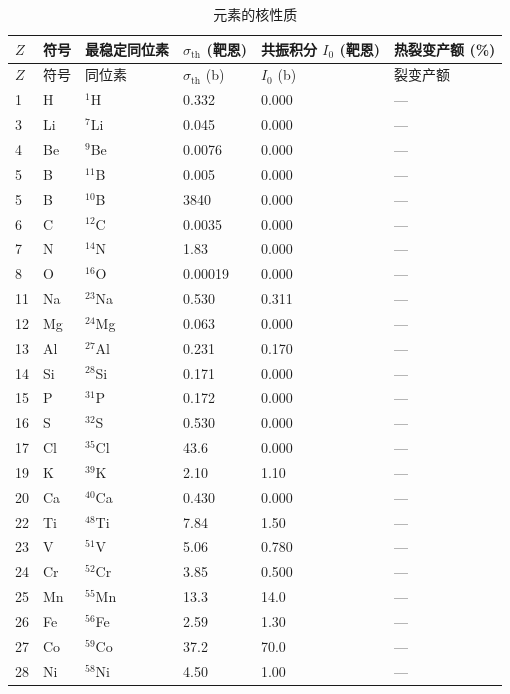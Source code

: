 \documentclass[12pt,a4paper]{article}
\begin{document}
	\begin{longtable}{p{0.8cm}p{1.2cm}p{2.0cm}p{2.5cm}p{2.5cm}p{2.5cm}}
		\caption{元素的核性质} \label{tab:nuclear-properties-func} \\
		\toprule
		\(Z\) & 符号 & 最稳定同位素 & \(\sigma_{\text{th}}\) (靶恩) & 共振积分 \(I_0\) (靶恩) & 热裂变产额 (\%) \\
		\midrule
		\endfirsthead
		\toprule
		\(Z\) & 符号 & 同位素 & \(\sigma_{\text{th}}\) (b) & \(I_0\) (b) & 裂变产额 \\
		\midrule
		\endhead
		1  & H  & \(^{1}\)H & 0.332 & 0.000 & --- \\
		3  & Li & \(^{7}\)Li & 0.045 & 0.000 & --- \\
		4  & Be & \(^{9}\)Be & 0.0076 & 0.000 & --- \\
		5  & B  & \(^{11}\)B & 0.005 & 0.000 & --- \\
		5  & B  & \(^{10}\)B & 3840 & 0.000 & --- \\
		6  & C  & \(^{12}\)C & 0.0035 & 0.000 & --- \\
		7  & N  & \(^{14}\)N & 1.83 & 0.000 & --- \\
		8  & O  & \(^{16}\)O & 0.00019 & 0.000 & --- \\
		11 & Na & \(^{23}\)Na & 0.530 & 0.311 & --- \\
		12 & Mg & \(^{24}\)Mg & 0.063 & 0.000 & --- \\
		13 & Al & \(^{27}\)Al & 0.231 & 0.170 & --- \\
		14 & Si & \(^{28}\)Si & 0.171 & 0.000 & --- \\
		15 & P  & \(^{31}\)P & 0.172 & 0.000 & --- \\
		16 & S  & \(^{32}\)S & 0.530 & 0.000 & --- \\
		17 & Cl & \(^{35}\)Cl & 43.6 & 0.000 & --- \\
		19 & K  & \(^{39}\)K & 2.10 & 1.10 & --- \\
		20 & Ca & \(^{40}\)Ca & 0.430 & 0.000 & --- \\
		22 & Ti & \(^{48}\)Ti & 7.84 & 1.50 & --- \\
		23 & V  & \(^{51}\)V & 5.06 & 0.780 & --- \\
		24 & Cr & \(^{52}\)Cr & 3.85 & 0.500 & --- \\
		25 & Mn & \(^{55}\)Mn & 13.3 & 14.0 & --- \\
		26 & Fe & \(^{56}\)Fe & 2.59 & 1.30 & --- \\
		27 & Co & \(^{59}\)Co & 37.2 & 70.0 & --- \\
		28 & Ni & \(^{58}\)Ni & 4.50 & 1.00 & --- \\

\end{longtable}
\end{document}
